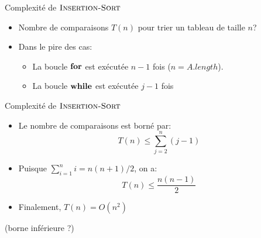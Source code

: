 \begin{frame}{Complexité de $\textnormal{\scshape Insertion-Sort}$}
\begin{center}
\end{center}

\bigskip

\begin{itemize}
\item Nombre de comparaisons $T(n)$ pour trier un tableau de taille $n$?
\item Dans le pire des cas:
\begin{itemize}
\item La boucle $\textbf{for}$ est exécutée $n-1$ fois ($n=A.length$).
\item La boucle $\textbf{while}$ est exécutée $j-1$ fois
\end{itemize}
\end{itemize}

\end{frame}

\begin{frame}{Complexité de $\textnormal{\scshape Insertion-Sort}$}

\begin{itemize}
\item Le nombre de comparaisons est borné par:
$$T(n)\leq \sum_{j=2}^n (j-1)$$
\item Puisque $\sum_{i=1}^n i=n(n+1)/2$, on a:
$$T(n)\leq\frac{n(n-1)}{2}$$
\item Finalement, $T(n)=O(n^2)$
\end{itemize}

\bigskip

(borne inférieure ?)

\end{frame}

